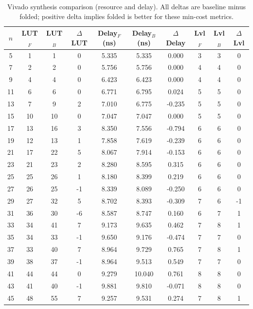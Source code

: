 \begin{table}[t]
\centering
\scriptsize
\setlength{\tabcolsep}{3.6pt}
\renewcommand{\arraystretch}{1.05}
\caption{Vivado synthesis comparison (resource and delay). All deltas are baseline minus folded; positive delta implies folded is better for these min-cost metrics.}
\label{tab:vivado_area_delay}
\begin{tabular}{cccccccccc}
\hline
$n$ & LUT$_F$ & LUT$_B$ & $\Delta$LUT & Delay$_F$ (ns) & Delay$_B$ (ns) & $\Delta$Delay & Lvl$_F$ & Lvl$_B$ & $\Delta$Lvl \\
\hline
5 & 1 & 1 & 0 & 5.335 & 5.335 & 0.000 & 3 & 3 & 0 \\
7 & 2 & 2 & 0 & 5.756 & 5.756 & 0.000 & 4 & 4 & 0 \\
9 & 4 & 4 & 0 & 6.423 & 6.423 & 0.000 & 4 & 4 & 0 \\
11 & 6 & 6 & 0 & 6.771 & 6.795 & 0.024 & 5 & 5 & 0 \\
13 & 7 & 9 & 2 & 7.010 & 6.775 & -0.235 & 5 & 5 & 0 \\
15 & 10 & 10 & 0 & 7.047 & 7.047 & 0.000 & 5 & 5 & 0 \\
17 & 13 & 16 & 3 & 8.350 & 7.556 & -0.794 & 6 & 6 & 0 \\
19 & 12 & 13 & 1 & 7.858 & 7.619 & -0.239 & 6 & 6 & 0 \\
21 & 17 & 22 & 5 & 8.067 & 7.914 & -0.153 & 6 & 6 & 0 \\
23 & 21 & 23 & 2 & 8.280 & 8.595 & 0.315 & 6 & 6 & 0 \\
25 & 25 & 26 & 1 & 8.180 & 8.399 & 0.219 & 6 & 6 & 0 \\
27 & 26 & 25 & -1 & 8.339 & 8.089 & -0.250 & 6 & 6 & 0 \\
29 & 27 & 32 & 5 & 8.702 & 8.393 & -0.309 & 7 & 6 & -1 \\
31 & 36 & 30 & -6 & 8.587 & 8.747 & 0.160 & 6 & 7 & 1 \\
33 & 34 & 41 & 7 & 9.173 & 9.635 & 0.462 & 7 & 8 & 1 \\
35 & 34 & 33 & -1 & 9.650 & 9.176 & -0.474 & 7 & 7 & 0 \\
37 & 33 & 40 & 7 & 8.964 & 9.729 & 0.765 & 7 & 8 & 1 \\
39 & 38 & 37 & -1 & 8.964 & 9.513 & 0.549 & 7 & 7 & 0 \\
41 & 44 & 44 & 0 & 9.279 & 10.040 & 0.761 & 8 & 8 & 0 \\
43 & 41 & 40 & -1 & 9.881 & 9.810 & -0.071 & 8 & 8 & 0 \\
45 & 48 & 55 & 7 & 9.257 & 9.531 & 0.274 & 7 & 8 & 1 \\

\end{tabular}
\end{table}
